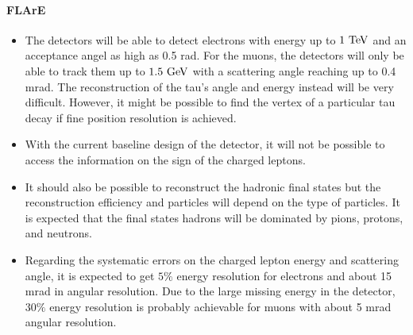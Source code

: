 \paragraph{FLArE}
\begin{itemize}
    \item The detectors will be able to detect electrons with energy up to
    $1~\rm{TeV}$ and an acceptance angel as high as 0.5 rad. For the muons,
    the detectors will only be able to track them up to $1.5~\rm{GeV}$ with
    a scattering angle reaching up to 0.4 mrad. The reconstruction of the
    tau's angle and energy instead will be very difficult. However, it might
    be possible to find the vertex of a particular tau decay if fine position
    resolution is achieved.
    \item With the current baseline design of the detector, it will not be
    possible to access the information on the sign of the charged leptons.
    \item It should also be possible to reconstruct the hadronic final
    states but the reconstruction efficiency and particles will depend on
    the type of particles. It is expected that the final states hadrons will
    be dominated by pions, protons, and neutrons.
    \item Regarding the systematic errors on the charged lepton energy and
    scattering angle, it is expected to get $5\%$ energy resolution for
    electrons and about 15 mrad in angular resolution. Due to the large
    missing energy in the detector, $30\%$ energy resolution is probably
    achievable for muons with about 5 mrad angular resolution.
\end{itemize}
